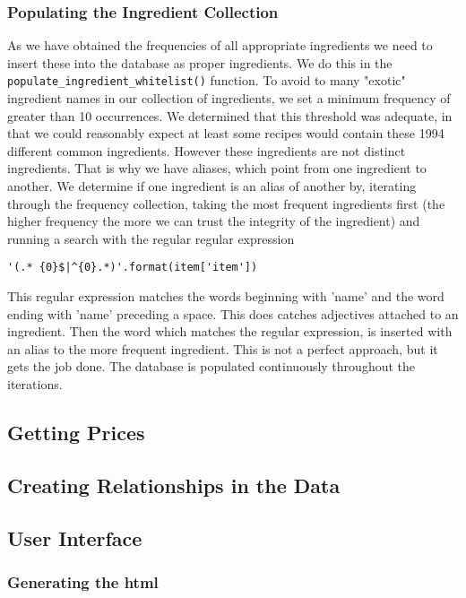 \documentclass{article}
\begin{document}
\subsubsection{Populating the Ingredient Collection}
As we have obtained the frequencies of all appropriate ingredients we need to insert
these into the database as proper ingredients. We do this in the
\texttt{populate\_ingredient\_whitelist()} function.
To avoid to many "exotic" ingredient names
in our collection of ingredients, we set a minimum frequency of greater than 10 occurrences. We
determined that this threshold was adequate, in that we could reasonably expect at least
some recipes would contain these 1994 different common ingredients. However these
ingredients are not distinct ingredients. That is why we have aliases, which point from
one ingredient to another. We determine if one ingredient is an alias of another by,
iterating through the frequency collection, taking the most frequent ingredients first
(the higher frequency the more we can trust the integrity of the ingredient) and running a
search with the regular regular expression
\begin{lstlisting}[basicstyle=\normalsize\ttfamily]
'(.* {0}$|^{0}.*)'.format(item['item'])\end{lstlisting}
This regular expression matches the words beginning with 'name' and the word ending with
'name' preceding a space. This does catches adjectives attached to an ingredient.
Then the word which matches the regular expression, is inserted with an alias to the more
frequent ingredient.  This is not a perfect approach, but it gets the job done. The
database is populated continuously throughout the iterations.


\subsection{Getting Prices}

\subsection{Creating Relationships in the Data}

\subsection{User Interface}
\subsubsection{Generating the html}
\end{document}
